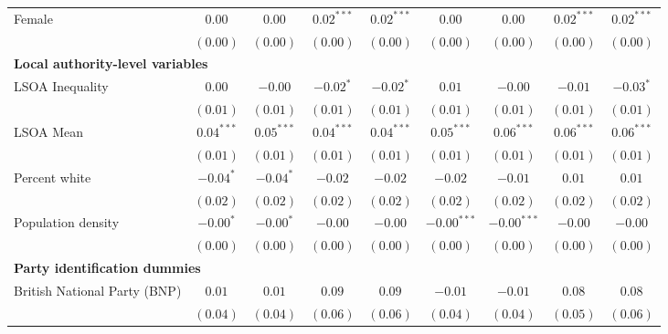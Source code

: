 \documentclass[12pt, letter]{scrartcl}
\begin{document}
\begin{tiny}
\begin{longtable}{lcccccccc}
Female                                      & $0.00$        & $0.00$        & $0.02^{***}$  & $0.02^{***}$  & $0.00$        & $0.00$        & $0.02^{***}$  & $0.02^{***}$  \\
                                            & $(0.00)$      & $(0.00)$      & $(0.00)$      & $(0.00)$      & $(0.00)$      & $(0.00)$      & $(0.00)$      & $(0.00)$      \\
\multicolumn{5}{l}{\textbf{Local authority-level variables}} \\[5pt]
LSOA Inequality                             & $0.00$        & $-0.00$       & $-0.02^{*}$   & $-0.02^{*}$   & $0.01$        & $-0.00$       & $-0.01$       & $-0.03^{*}$   \\
                                            & $(0.01)$      & $(0.01)$      & $(0.01)$      & $(0.01)$      & $(0.01)$      & $(0.01)$      & $(0.01)$      & $(0.01)$      \\
LSOA Mean                                   & $0.04^{***}$  & $0.05^{***}$  & $0.04^{***}$  & $0.04^{***}$  & $0.05^{***}$  & $0.06^{***}$  & $0.06^{***}$  & $0.06^{***}$  \\
                                            & $(0.01)$      & $(0.01)$      & $(0.01)$      & $(0.01)$      & $(0.01)$      & $(0.01)$      & $(0.01)$      & $(0.01)$      \\
Percent white                               & $-0.04^{*}$   & $-0.04^{*}$   & $-0.02$       & $-0.02$       & $-0.02$       & $-0.01$       & $0.01$        & $0.01$        \\
                                            & $(0.02)$      & $(0.02)$      & $(0.02)$      & $(0.02)$      & $(0.02)$      & $(0.02)$      & $(0.02)$      & $(0.02)$      \\
Population density                          & $-0.00^{*}$   & $-0.00^{*}$   & $-0.00$       & $-0.00$       & $-0.00^{***}$ & $-0.00^{***}$ & $-0.00$       & $-0.00$       \\
                                            & $(0.00)$      & $(0.00)$      & $(0.00)$      & $(0.00)$      & $(0.00)$      & $(0.00)$      & $(0.00)$      & $(0.00)$      \\
\multicolumn{5}{l}{\textbf{Party identification dummies}} \\[5pt]
British National Party (BNP)                & $0.01$        & $0.01$        & $0.09$        & $0.09$        & $-0.01$       & $-0.01$       & $0.08$        & $0.08$        \\
                                            & $(0.04)$      & $(0.04)$      & $(0.06)$      & $(0.06)$      & $(0.04)$      & $(0.04)$      & $(0.05)$      & $(0.06)$      \\

\end{longtable}
\end{tiny}
\end{document}
